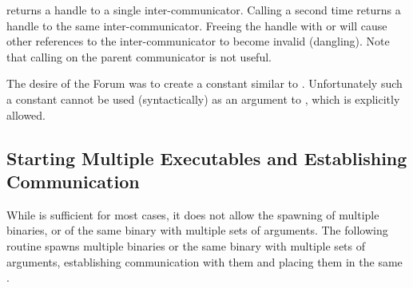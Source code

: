 \begin{users}
 returns a handle to a single inter-communicator.
Calling  a second time returns a handle
to the same inter-communicator. Freeing the handle with 
or  will cause other references to
the inter-communicator to become invalid (dangling).
Note that calling  on the parent
communicator is not useful.
\end{users}

\begin{rationale}
The desire of the Forum was to create a constant 
similar to . Unfortunately such a constant cannot
be used (syntactically) as an argument to ,
which is explicitly allowed.
\end{rationale}



\subsection{Starting Multiple Executables and Establishing Communication}
\label{subsec:multiple}

While  is sufficient for most cases, it does
not allow the spawning of multiple binaries, or of the same
binary with multiple sets of arguments.
The following routine spawns multiple binaries or the same binary
with multiple sets of arguments, establishing communication with them
and placing them in the same  .


